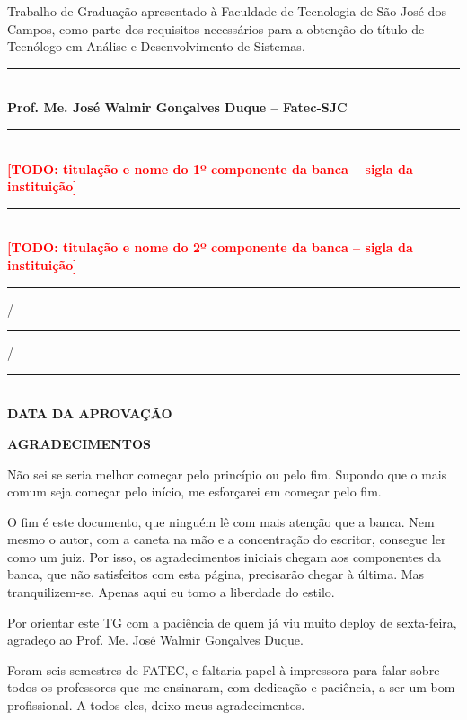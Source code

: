 \documentclass[12pt,a4paper]{article}
\newcommand{\titulocentralizado}[1]{\begin{center}\large\textbf{#1}\end{center}\vspace{12pt}}
\newcommand{\natureza}{Trabalho de Graduação apresentado à Faculdade de Tecnologia de São José dos Campos, como parte dos requisitos necessários para a obtenção do título de Tecnólogo em Análise e Desenvolvimento de Sistemas.}
\begin{document}
\vspace{1cm}
\noindent\hfill\begin{minipage}{8cm}
\singlespacing
\natureza
\end{minipage}

\vspace{1.5cm}
\begin{center}
\singlespacing
\rule{12cm}{0.4pt}\\
\textbf{Prof. Me. José Walmir Gonçalves Duque -- Fatec-SJC}

\vspace{1.4cm}
\rule{12cm}{0.4pt}\\
\textbf{\textcolor{red}{[TODO: titulação e nome do 1º componente da banca – sigla da instituição]}}

\vspace{1.4cm}
\rule{12cm}{0.4pt}\\
\textbf{\textcolor{red}{[TODO: titulação e nome do 2º componente da banca – sigla da instituição]}}

\vspace{1.4cm}
\rule{1.2cm}{0.4pt}/\rule{1.2cm}{0.4pt}/\rule{1.2cm}{0.4pt}\\
\textbf{DATA DA APROVAÇÃO}
\end{center}
\clearpage

\titulocentralizado{AGRADECIMENTOS}

Não sei se seria melhor começar pelo princípio ou pelo fim. Supondo que o mais comum seja começar
pelo início, me esforçarei em começar pelo fim.

O fim é este documento, que ninguém lê com mais atenção que a banca. Nem mesmo o autor,
com a caneta na mão e a concentração do escritor, consegue ler como um juiz. Por isso,
os agradecimentos iniciais chegam aos componentes da banca, que não satisfeitos com esta página,
precisarão chegar à última. Mas tranquilizem-se. Apenas aqui eu tomo a liberdade do estilo.

Por orientar este TG com a paciência de quem já viu muito deploy de sexta-feira,
agradeço ao Prof. Me. José Walmir Gonçalves Duque.

Foram seis semestres de FATEC, e faltaria papel à impressora para falar sobre todos os professores
que me ensinaram, com dedicação e paciência, a ser um bom profissional. A todos eles, deixo meus agradecimentos.
\end{document}
